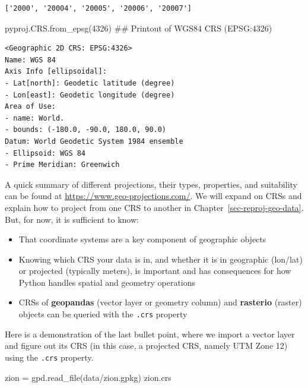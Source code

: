 \documentclass[
  letterpaper,
]{krantz}
\newenvironment{Shaded}{\begin{snugshade}}{\end{snugshade}}
\newcommand{\CommentTok}[1]{\textcolor[rgb]{0.37,0.37,0.37}{#1}}
\newcommand{\DecValTok}[1]{\textcolor[rgb]{0.68,0.00,0.00}{#1}}
\newcommand{\NormalTok}[1]{\textcolor[rgb]{0.00,0.23,0.31}{#1}}
\newcommand{\OperatorTok}[1]{\textcolor[rgb]{0.37,0.37,0.37}{#1}}
\newcommand{\StringTok}[1]{\textcolor[rgb]{0.13,0.47,0.30}{#1}}
\providecommand{\tightlist}{%
  \setlength{\itemsep}{0pt}\setlength{\parskip}{0pt}}\usepackage{longtable,booktabs,array}
\begin{document}
\begin{verbatim}
['2000', '20004', '20005', '20006', '20007']
\end{verbatim}

\begin{Shaded}
\begin{Highlighting}[]
\NormalTok{pyproj.CRS.from\_epsg(}\DecValTok{4326}\NormalTok{)  }\CommentTok{\#\# Printout of WGS84 CRS (EPSG:4326)}
\end{Highlighting}
\end{Shaded}

\begin{verbatim}
<Geographic 2D CRS: EPSG:4326>
Name: WGS 84
Axis Info [ellipsoidal]:
- Lat[north]: Geodetic latitude (degree)
- Lon[east]: Geodetic longitude (degree)
Area of Use:
- name: World.
- bounds: (-180.0, -90.0, 180.0, 90.0)
Datum: World Geodetic System 1984 ensemble
- Ellipsoid: WGS 84
- Prime Meridian: Greenwich
\end{verbatim}

A quick summary of different projections, their types, properties, and
suitability can be found at \url{https://www.geo-projections.com/}. We
will expand on CRSs and explain how to project from one CRS to another
in Chapter~\ref{sec-reproj-geo-data}. But, for now, it is sufficient to
know:

\begin{itemize}
\tightlist
\item
  That coordinate systems are a key component of geographic objects
\item
  Knowing which CRS your data is in, and whether it is in geographic
  (lon/lat) or projected (typically meters), is important and has
  consequences for how Python handles spatial and geometry operations
\item
  CRSs of \textbf{geopandas} (vector layer or geometry column) and
  \textbf{rasterio} (raster) objects can be queried with the
  \texttt{.crs} property
\end{itemize}

Here is a demonstration of the last bullet point, where we import a
vector layer and figure out its CRS (in this case, a projected CRS,
namely UTM Zone 12) using the \texttt{.crs} property.

\begin{Shaded}
\begin{Highlighting}[]
\NormalTok{zion }\OperatorTok{=}\NormalTok{ gpd.read\_file(}\StringTok{\textquotesingle{}data/zion.gpkg\textquotesingle{}}\NormalTok{)}
\NormalTok{zion.crs}
\end{Highlighting}
\end{Shaded}
\end{document}

